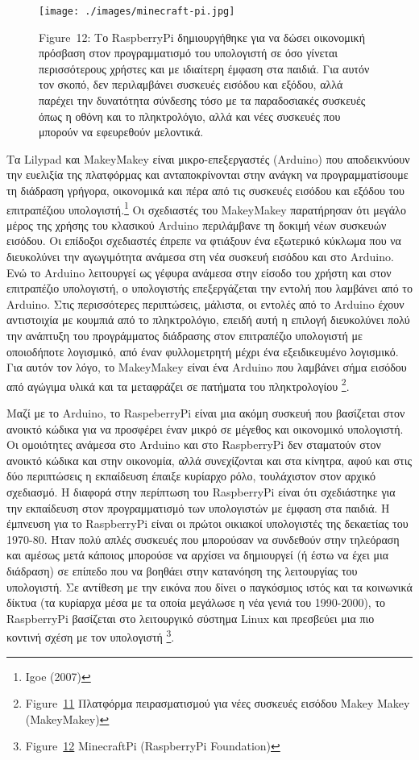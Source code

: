 \documentclass[
]{article}
\begin{document}
\leavevmode{}%
\begin{figure}
\hypertarget{fig:minecraft-pi}{%
\centering
\texttt{[image: ./images/minecraft-pi.jpg]}
\caption{Figure~12: Το RaspberryPi δημιουργήθηκε για να δώσει οικονομική
πρόσβαση στον προγραμματισμό του υπολογιστή σε όσο γίνεται περισσότερους
χρήστες και με ιδιαίτερη έμφαση στα παιδιά. Για αυτόν τον σκοπό, δεν
περιλαμβάνει συσκευές εισόδου και εξόδου, αλλά παρέχει την δυνατότητα
σύνδεσης τόσο με τα παραδοσιακές συσκευές όπως η οθόνη και το
πληκτρολόγιο, αλλά και νέες συσκευές που μπορούν να εφευρεθούν
μελοντικά.}\label{fig:minecraft-pi}
}
\end{figure}

Τα Lilypad και MakeyMakey είναι μικρο-επεξεργαστές (Arduino) που
αποδεικνύουν την ευελιξία της πλατφόρμας και ανταποκρίνονται στην ανάγκη
να προγραμματίσουμε τη διάδραση γρήγορα, οικονομικά και πέρα από τις
συσκευές εισόδου και εξόδου του επιτραπέζιου υπολογιστή.\footnote{Igoe
  (2007)} Οι σχεδιαστές του MakeyMakey παρατήρησαν ότι μεγάλο μέρος της
χρήσης του κλασικού Arduino περιλάμβανε τη δοκιμή νέων συσκευών εισόδου.
Οι επίδοξοι σχεδιαστές έπρεπε να φτιάξουν ένα εξωτερικό κύκλωμα που να
διευκολύνει την αγωγιμότητα ανάμεσα στη νέα συσκευή εισόδου και στο
Arduino. Ενώ το Arduino λειτουργεί ως γέφυρα ανάμεσα στην είσοδο του
χρήστη και στον επιτραπέζιο υπολογιστή, ο υπολογιστής επεξεργάζεται την
εντολή που λαμβάνει από το Arduino. Στις περισσότερες περιπτώσεις,
μάλιστα, οι εντολές από το Arduino έχουν αντιστοιχία με κουμπιά από το
πληκτρολόγιο, επειδή αυτή η επιλογή διευκολύνει πολύ την ανάπτυξη του
προγράμματος διάδρασης στον επιτραπέζιο υπολογιστή με οποιοδήποτε
λογισμικό, από έναν φυλλομετρητή μέχρι ένα εξειδικευμένο λογισμικό. Για
αυτόν τον λόγο, το MakeyMakey είναι ένα Arduino που λαμβάνει σήμα
εισόδου από αγώγιμα υλικά και τα μεταφράζει σε πατήματα του
πληκτρολογίου \footnote{Figure~\protect\hyperlink{fig:makey_makey_front}{11}
  Πλατφόρμα πειρασματισμού για νέες συσκευές εισόδου Makey Makey
  (MakeyMakey)}.

Μαζί με το Arduino, το RaspeberryPi είναι μια ακόμη συσκευή που
βασίζεται στον ανοικτό κώδικα για να προσφέρει έναν μικρό σε μέγεθος και
οικονομικό υπολογιστή. Οι ομοιότητες ανάμεσα στο Arduino και στο
RaspberryPi δεν σταματούν στον ανοικτό κώδικα και στην οικονομία, αλλά
συνεχίζονται και στα κίνητρα, αφού και στις δύο περιπτώσεις η εκπαίδευση
έπαιξε κυρίαρχο ρόλο, τουλάχιστον στον αρχικό σχεδιασμό. Η διαφορά στην
περίπτωση του RaspberryPi είναι ότι σχεδιάστηκε για την εκπαίδευση στον
προγραμματισμό των υπολογιστών με έμφαση στα παιδιά. Η έμπνευση για το
RaspberryPi είναι οι πρώτοι οικιακοί υπολογιστές της δεκαετίας του
1970-80. Ήταν πολύ απλές συσκευές που μπορούσαν να συνδεθούν στην
τηλεόραση και αμέσως μετά κάποιος μπορούσε να αρχίσει να δημιουργεί (ή
έστω να έχει μια διάδραση) σε επίπεδο που να βοηθάει στην κατανόηση της
λειτουργίας του υπολογιστή. Σε αντίθεση με την εικόνα που δίνει ο
παγκόσμιος ιστός και τα κοινωνικά δίκτυα (τα κυρίαρχα μέσα με τα οποία
μεγάλωσε η νέα γενιά του 1990-2000), το RaspberryPi βασίζεται στο
λειτουργικό σύστημα Linux και πρεσβεύει μια πιο κοντινή σχέση με τον
υπολογιστή \footnote{Figure~\protect\hyperlink{fig:minecraft-pi}{12}
  MinecraftPi (RaspberryPi Foundation)}.
\end{document}
